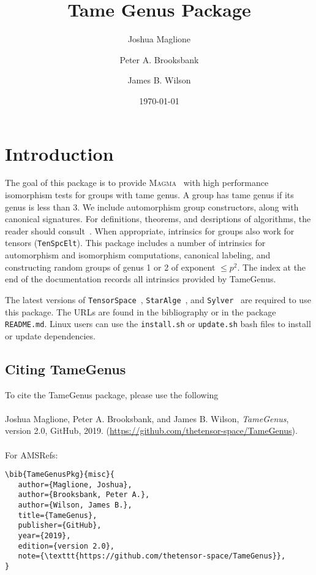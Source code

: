 \documentclass{documentation}
\title{Tame Genus Package}
\author{Joshua Maglione}
\author{Peter A. Brooksbank}
\author{James B. Wilson}
\date{\today}
\begin{document}
\frontmatter

\maketitle
\tableofcontents

\mainmatter

\chapter{Introduction}

The goal of this package is to provide \textsc{Magma}~\cite{Magma} with high performance isomorphism tests for groups with tame genus. A group has tame genus if its genus is less than $3$. We include automorphism group constructors, along with canonical signatures. For definitions, theorems, and desriptions of algorithms, the reader should consult~\cite{BMW}.
When appropriate, intrinsics for groups also work for tensors (\texttt{TenSpcElt}). 
This package includes a number of intrinsics for automorphism and isomorphism computations, canonical labeling, and constructing random groups of genus 1 or 2 of exponent  $\leq p^2$. The index at the end of the documentation records all intrinsics provided by TameGenus. 

The latest versions of \texttt{TensorSpace}~\cite{TensorSpacePackage}, \texttt{StarAlge}~\cite{StarAlge}, and \texttt{Sylver}~\cite{Sylver} are required to use this package. 
The URLs are found in the bibliography or in the package \texttt{README.md}. Linux users can use the \texttt{install.sh} or \texttt{update.sh} bash files to install or update dependencies.

\section{Citing TameGenus} 
To cite the TameGenus package, please use the following\\
\\
Joshua Maglione, Peter A. Brooksbank, and James B. Wilson, \emph{TameGenus}, version 2.0, GitHub, 2019. (\url{https://github.com/thetensor-space/TameGenus}). \\
\\
For AMSRefs:
\begin{verbatim}
\bib{TameGenusPkg}{misc}{
   author={Maglione, Joshua},
   author={Brooksbank, Peter A.},
   author={Wilson, James B.},
   title={TameGenus},
   publisher={GitHub},
   year={2019},
   edition={version 2.0},
   note={\texttt{https://github.com/thetensor-space/TameGenus}},
}
\end{verbatim}
\end{document}
